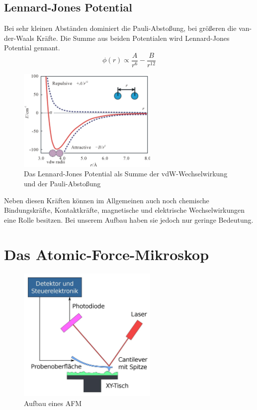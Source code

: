         \subsection{Lennard-Jones Potential}

Bei sehr kleinen Abständen dominiert die Pauli-Abstoßung, bei größeren die 
van-der-Waals Kräfte. Die Summe aus beiden Potentialen wird Lennard-Jones 
Potential gennant. 
\[
   \phi (r) \propto \frac{A}{r^6} - \frac{B}{r^{12}}    
\]

\begin{figure}[h!]
    \centering
    \includegraphics[width=0.6\textwidth]{Abb/ljp.jpg}
    \caption{Das Lennard-Jones Potential als Summe der vdW-Wechselwirkung und
             der Pauli-Abstoßung}
    \label{ljp}
\end{figure}



Neben diesen Kräften können im Allgemeinen auch noch chemische Bindungskräfte, Kontaktkräfte, magnetische und elektrische Wechselwirkungen eine Rolle besitzen.
Bei unserem Aufbau haben sie jedoch nur geringe Bedeutung.



 \section{Das Atomic-Force-Mikroskop}
 
\begin{figure}[h!]
    \centering
    \includegraphics[width=0.6\textwidth]{Abb/afm.jpg}
    \caption{Aufbau eines AFM}
    \label{afm}
\end{figure}
 
